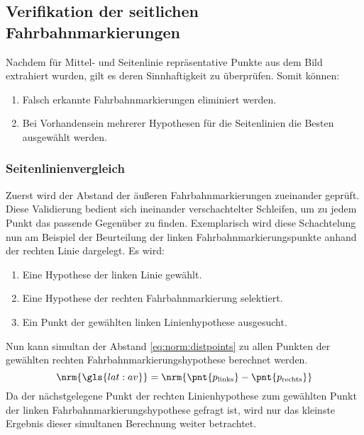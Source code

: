 \subsection{Verifikation der seitlichen Fahrbahnmarkierungen \dcsecondauthorshort}
%
\label{ssec:fahrspurerkennung:riverflow:verifikation}
Nachdem für Mittel- und Seitenlinie repräsentative Punkte aus dem Bild extrahiert wurden, gilt es deren Sinnhaftigkeit zu überprüfen. Somit können:
\begin{enumerate}
\item Falsch erkannte Fahrbahnmarkierungen eliminiert werden.
\item Bei Vorhandensein mehrerer Hypothesen für die Seitenlinien die Besten ausgewählt werden.
\end{enumerate}

\subsubsection{Seitenlinienvergleich} 
\label{sssec:fahrspurerkennung:riverflow:verifikation:seitenlinienvergleich}
Zuerst wird der Abstand der äußeren Fahrbahnmarkierungen zueinander geprüft. Diese Validierung bedient sich ineinander verschachtelter Schleifen, um zu jedem Punkt das passende Gegenüber zu finden. Exemplarisch wird diese Schachtelung nun am Beispiel der Beurteilung der linken Fahrbahnmarkierungspunkte anhand der rechten Linie dargelegt. Es wird:
\begin{enumerate}
\item 
Eine Hypothese der linken Linie gewählt.
\item \label{item:riverflow:verification:l_r:loops:right_hypo}
Eine Hypothese der rechten Fahrbahnmarkierung selektiert.
\item \label{item:riverflow:verification:l_r:loops:point}
Ein Punkt der gewählten linken Linienhypothese ausgesucht.
\end{enumerate}
Nun kann simultan der Abstand  \eqref{eq:norm:distpoints} 
zu allen Punkten der gewählten rechten Fahrbahnmarkierungshypothese berechnet werden. 
\begin{equation}
\label{eq:norm:distpoints} 
\nrm{\gls{lat:av}} = \nrm{\pnt{p_{\text{links}}} - \pnt{p_{\text{rechts}}}} 
\end{equation}
Da der nächstgelegene Punkt der rechten Linienhypothese zum gewählten Punkt der linken Fahrbahnmarkierungshypothese gefragt ist, wird nur das kleinste Ergebnis dieser simultanen Berechnung weiter betrachtet.

